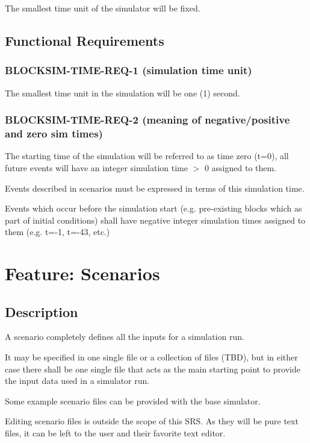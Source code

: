 \documentclass{scrreprt}
\begin{document}
The smallest time unit of the simulator will be fixed.


\subsection{Functional Requirements}


\subsubsection{BLOCKSIM-TIME-REQ-1 (simulation time unit)}

The smallest time unit in the simulation will be one (1) second.

\subsubsection{BLOCKSIM-TIME-REQ-2 (meaning of negative/positive and zero sim times)}

The starting time of the simulation will be referred to as time zero
(t=0), all future events will have an integer simulation time $>$ 0
assigned to them.

Events described in scenarios must be expressed in terms of this
simulation time.

Events which occur before the simulation start (e.g. pre-existing blocks
which as part of initial conditions) shall have negative integer simulation
times assigned to them (e.g. t=-1, t=-43, etc.)



\section{Feature: Scenarios}

\subsection{Description}

A scenario completely defines all the inputs for a simulation run.

It may be specified in one single file or a collection of files (TBD),
but in either case there shall be one single file that acts as the
main starting point to provide the input data used in a simulator run.

Some example scenario files can be provided with the base simulator.

Editing scenario files is outside the scope of this SRS. As they will be pure
text files, it can be left to the user and their favorite text editor.
\end{document}
